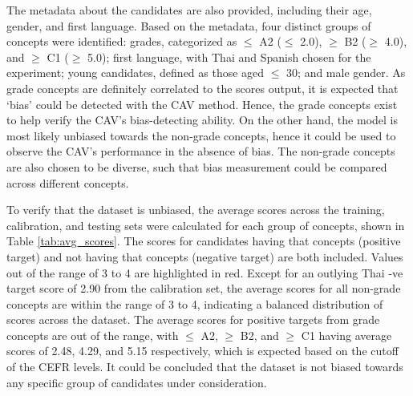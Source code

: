 The metadata about the candidates are also provided, including their age, gender, and first language. Based on the metadata, four distinct groups of concepts were identified: grades, categorized as $\leq$ A2 ($\leq$ 2.0), $\geq$ B2 ($\geq$ 4.0), and $\geq$ C1 ($\geq$ 5.0); first language, with Thai and Spanish chosen for the experiment; young candidates, defined as those aged $\leq$ 30; and male gender. As grade concepts are definitely correlated to the scores output, it is expected that `bias' could be detected with the CAV method. Hence, the grade concepts exist to help verify the CAV's bias-detecting ability. On the other hand, the model is most likely unbiased towards the non-grade concepts, hence it could be used to observe the CAV's performance in the absence of bias. The non-grade concepts are also chosen to be diverse, such that bias measurement could be compared across different concepts.

To verify that the dataset is unbiased, the average scores across the training, calibration, and testing sets were calculated for each group of concepts, shown in Table \ref{tab:avg_scores}. The scores for candidates having that concepts (positive target) and not having that concepts (negative target) are both included. Values out of the range of 3 to 4 are highlighted in red. Except for an outlying Thai -ve target score of 2.90 from the calibration set, the average scores for all non-grade concepts are within the range of 3 to 4, indicating a balanced distribution of scores across the dataset. The average scores for positive targets from grade concepts are out of the range, with $\leq$ A2, $\geq$ B2, and $\geq$ C1 having average scores of 2.48, 4.29, and 5.15 respectively, which is expected based on the cutoff of the CEFR levels. It could be concluded that the dataset is not biased towards any specific group of candidates under consideration.

